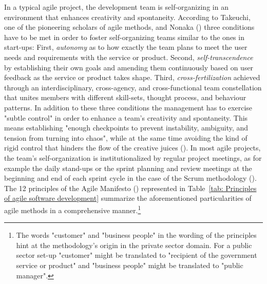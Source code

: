 In a typical agile project, the development team is self-organizing in an environment that enhances creativity and spontaneity. According to Takeuchi, one of the pioneering scholars of agile methods, and Nonaka  (\cite*{TakeuchiI1986}) three conditions have to be met in order to foster self-organizing teams similar to the ones in start-ups: First, \textit{autonomy} as to how exactly the team plans to meet the user needs and requirements with the service or product. Second, \textit{self-transcendence} by establishing their own goals and amending them continuously based on user feedback as the service or product takes shape. Third, \textit{cross-fertilization} achieved through an interdisciplinary, cross-agency, and cross-functional team constellation that unites members with different skill-sets, thought process, and behaviour patterns. In addition to these three conditions the management has to exercise "subtle control" in order to enhance a team's creativity and spontaneity. This means establishing "enough checkpoints to prevent instability, ambiguity, and tension from turning into chaos", while at the same time avoiding the kind of rigid control that hinders the flow of the creative juices (\cite{TakeuchiI1986}). In most agile projects, the team's self-organization is institutionalized by regular project meetings, as for example the daily stand-ups or the sprint planning and review meetings at the beginning and end of each sprint cycle in the case of the Scrum methodology (\cite{Scrum.org2019}). The 12 principles of the Agile Manifesto (\cite*{AgileManifesto2001}) represented in Table~\ref{tab: Principles of agile software development} summarize the aforementioned particularities of agile methods in a comprehensive manner.\footnote{The words "customer" and "business people" in the wording of the principles hint at the methodology's origin in the private sector domain. For a public sector set-up "customer" might be translated to "recipient of the government service or product" and "business people" might be translated to "public manager".}
\begingroup
